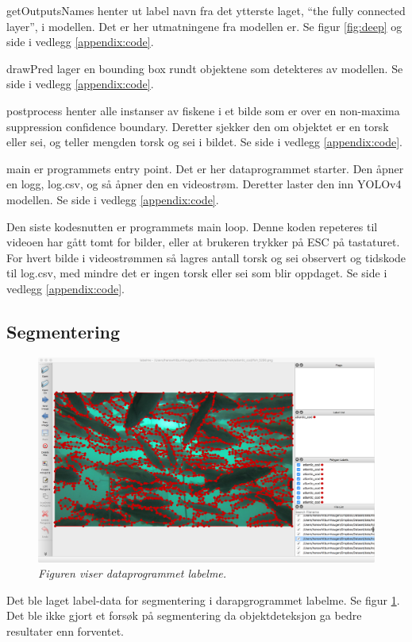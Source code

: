 getOutputsNames henter ut label navn fra det ytterste laget, ``the fully connected layer'', i modellen. Det er her utmatningene fra modellen er. Se figur \ref{fig:deep} og side \pageref{lst:getOutputsNames} i vedlegg \ref{appendix:code}.

drawPred lager en bounding box rundt objektene som detekteres av modellen. Se side \pageref{lst:drawPred} i vedlegg \ref{appendix:code}.

postprocess henter alle instanser av fiskene i et bilde som er over en non-maxima suppression confidence boundary. Deretter sjekker den om objektet er en torsk eller sei, og teller mengden torsk og sei i bildet. Se side \pageref{lst:postprocess} i vedlegg \ref{appendix:code}.

main er programmets entry point. Det er her dataprogrammet starter. Den åpner en logg, log.csv, og så åpner den en videostrøm. Deretter laster den inn YOLOv4 modellen. Se side \pageref{lst:main} i vedlegg \ref{appendix:code}.

Den siste kodesnutten er programmets main loop. Denne koden repeteres til videoen har gått tomt for bilder, eller at brukeren trykker på ESC på tastaturet. For hvert bilde i videostrømmen så lagres antall torsk og sei observert og tidskode til log.csv, med mindre det er ingen torsk eller sei som blir oppdaget. Se side \pageref{lst:mainloop} i vedlegg \ref{appendix:code}.


\subsection{Segmentering}

\begin{figure}[h!]
\begin{center} 
\includegraphics[scale=0.25]{figures/labelme}
\caption{\small \sl Figuren viser dataprogrammet labelme. \cite{Wada 2016} \label{fig:labelme}} 
\end{center} 
\end{figure} 

Det ble laget label-data for segmentering i darapgrogrammet labelme. Se figur \ref{fig:labelme}. Det ble ikke gjort et forsøk på segmentering da objektdeteksjon ga bedre resultater enn forventet.
